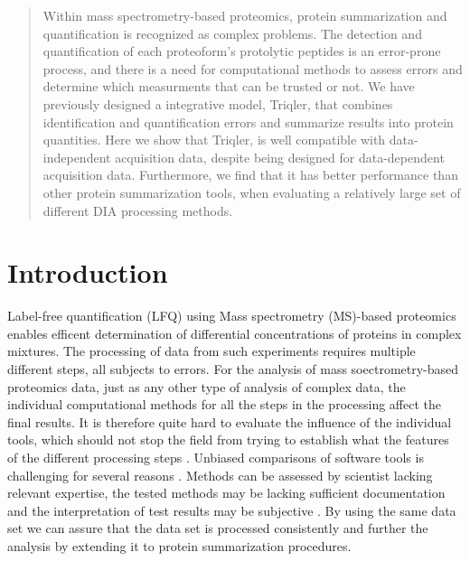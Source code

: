 \documentclass[10pt,letterpaper]{article}
\begin{document}
\maketitle



\begin{abstract}

Within mass spectrometry-based proteomics, protein summarization and quantification is recognized as complex problems. The detection and quantification of each proteoform's protolytic peptides is an error-prone process, and there is a need for computational methods to assess errors and determine which measurments that can be trusted or not.  We have previously designed a integrative model, Triqler, that combines identification and quantification errors and summarize results into protein quantities. 
Here we show that Triqler, is well compatible with data-independent acquisition data, despite being designed for data-dependent acquisition data. Furthermore, we find that it has better performance than other protein summarization tools, when evaluating a relatively large set of different DIA processing methods. 

\end{abstract}
  

\section*{Introduction}

Label-free quantification (LFQ) using Mass spectrometry (MS)-based proteomics enables efficent determination of differential concentrations of proteins in complex mixtures. The processing of data from such experiments requires multiple different steps, all subjects to errors. 
For the analysis of mass soectrometry-based proteomics data, just as any other type of analysis of complex data, the individual computational methods for all the steps in the processing affect the final results. It is therefore quite hard to evaluate the influence of the individual tools, which should not stop the field from trying to establish what the features of the different processing steps \cite{dufresne2014abrf,gatto2016testing,navarro2016multicenter}. Unbiased comparisons of software tools is challenging for several reasons \cite{dufresne2014abrf}. Methods can be assessed by scientist lacking relevant expertise, the tested methods may be lacking sufficient documentation and the interpretation of test results may be subjective \cite{yates2012toward} \cite{leprevost2014best} \cite{pak2013clustering} \cite{faircomparison2015}. By using the same data set we can assure that the data set is processed consistently and further the analysis by extending it to protein summarization procedures.
\end{document}

